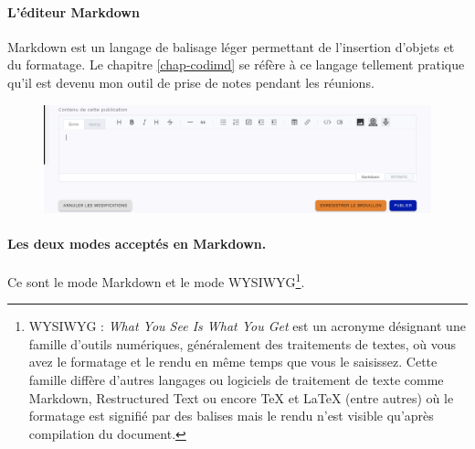 \paragraph{L'éditeur Markdown}
Markdown est un langage de balisage léger permettant de l'insertion d'objets et du formatage. 
Le chapitre \ref{chap-codimd} se réfère à ce langage tellement pratique qu'il est devenu mon outil de prise de notes pendant les réunions.
\begin{figure}
	\centering
	\includegraphics{./Captures/portail.publications.creer.publication.2.markdown.png}
	\caption{}
\end{figure}

\paragraph{Les deux modes acceptés en Markdown.} 
Ce sont le mode Markdown et le mode WYSIWYG\footnote{%
WYSIWYG : \emph{What You See Is What You Get} est un acronyme désignant une famille d'outils numériques, généralement des traitements de textes, où vous avez le formatage et le rendu en même temps que vous le saisissez. 
Cette famille diffère d'autres langages ou logiciels de traitement de texte comme Markdown, Restructured Text ou encore \TeX{} et \LaTeX{} (entre autres) où le formatage est signifié par des balises mais le rendu n'est visible qu'après compilation du document.
}.

